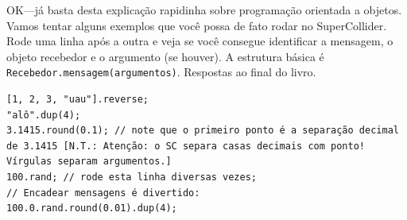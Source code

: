 OK---já basta desta explicação rapidinha sobre programação orientada a objetos. Vamos tentar alguns exemplos que você possa de fato rodar no SuperCollider. Rode uma linha após a outra e veja se você consegue identificar a mensagem, o objeto recebedor e o argumento (se houver). A estrutura básica é \texttt{Recebedor.mensagem(argumentos)}. Respostas ao final do livro.

 
\begin{lstlisting}[style=SuperCollider-IDE, basicstyle=\scttfamily\footnotesize]
[1, 2, 3, "uau"].reverse;
"alô".dup(4); 
3.1415.round(0.1); // note que o primeiro ponto é a separação decimal de 3.1415 [N.T.: Atenção: o SC separa casas decimais com ponto! Vírgulas separam argumentos.]
100.rand; // rode esta linha diversas vezes;
// Encadear mensagens é divertido:
100.0.rand.round(0.01).dup(4);
\end{lstlisting}
